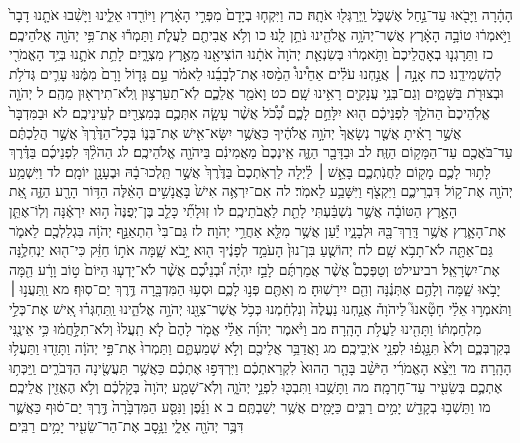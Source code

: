 \documentclass[twoside, openany, parskip=half, 11pt]{book}
\begin{document}
הָהָ֔רָה וַיָּבֹ֖אוּ עַד־נַ֣חַל אֶשְׁכֹּ֑ל וַֽיְרַגְּל֖וּ אֹתָֽהּ׃ כה וַיִּקְח֤וּ בְיָדָם֙ מִפְּרִ֣י הָאָ֔רֶץ וַיּוֹרִ֖דוּ אֵלֵ֑ינוּ וַיָּשִׁ֨בוּ אֹתָ֤נוּ דָבָר֙ וַיֹּ֣אמְר֔וּ טוֹבָ֣ה הָאָ֔רֶץ אֲשֶׁר־יְהֹוָ֥ה אֱלֹהֵ֖ינוּ נֹתֵ֥ן לָֽנוּ׃ כו וְלֹ֥א אֲבִיתֶ֖ם לַעֲלֹ֑ת וַתַּמְר֕וּ אֶת־פִּ֥י יְהֹוָ֖ה אֱלֹהֵיכֶֽם׃ כז וַתֵּרָגְנ֤וּ בְאׇהֳלֵיכֶם֙ וַתֹּ֣אמְר֔וּ בְּשִׂנְאַ֤ת יְהֹוָה֙ אֹתָ֔נוּ הוֹצִיאָ֖נוּ מֵאֶ֣רֶץ מִצְרָ֑יִם לָתֵ֥ת אֹתָ֛נוּ בְּיַ֥ד הָאֱמֹרִ֖י לְהַשְׁמִידֵֽנוּ׃ כח אָנָ֣ה ׀ אֲנַ֣חְנוּ עֹלִ֗ים אַחֵ֩ינוּ֩ הֵמַ֨סּוּ אֶת־לְבָבֵ֜נוּ לֵאמֹ֗ר עַ֣ם גָּד֤וֹל וָרָם֙ מִמֶּ֔נּוּ עָרִ֛ים גְּדֹלֹ֥ת וּבְצוּרֹ֖ת בַּשָּׁמָ֑יִם וְגַם־בְּנֵ֥י עֲנָקִ֖ים רָאִ֥ינוּ שָֽׁם׃ כט וָאֹמַ֖ר אֲלֵכֶ֑ם לֹֽא־תַעַרְצ֥וּן וְֽלֹא־תִירְא֖וּן מֵהֶֽם׃ ל יְהֹוָ֤ה אֱלֹֽהֵיכֶם֙ הַהֹלֵ֣ךְ לִפְנֵיכֶ֔ם ה֖וּא יִלָּחֵ֣ם לָכֶ֑ם כְּ֠כֹ֠ל אֲשֶׁ֨ר עָשָׂ֧ה אִתְּכֶ֛ם בְּמִצְרַ֖יִם לְעֵינֵיכֶֽם׃ לא וּבַמִּדְבָּר֙ אֲשֶׁ֣ר רָאִ֔יתָ אֲשֶׁ֤ר נְשָׂאֲךָ֙ יְהֹוָ֣ה אֱלֹהֶ֔יךָ כַּאֲשֶׁ֥ר יִשָּׂא־אִ֖ישׁ אֶת־בְּנ֑וֹ בְּכׇל־הַדֶּ֙רֶךְ֙ אֲשֶׁ֣ר הֲלַכְתֶּ֔ם עַד־בֹּאֲכֶ֖ם עַד־הַמָּק֥וֹם הַזֶּֽה׃ לב וּבַדָּבָ֖ר הַזֶּ֑ה אֵֽינְכֶם֙ מַאֲמִינִ֔ם בַּיהֹוָ֖ה אֱלֹהֵיכֶֽם׃ לג הַהֹלֵ֨ךְ לִפְנֵיכֶ֜ם בַּדֶּ֗רֶךְ לָת֥וּר לָכֶ֛ם מָק֖וֹם לַחֲנֹֽתְכֶ֑ם בָּאֵ֣שׁ ׀ לַ֗יְלָה לַרְאֹֽתְכֶם֙ בַּדֶּ֙רֶךְ֙ אֲשֶׁ֣ר תֵּֽלְכוּ־בָ֔הּ וּבֶעָנָ֖ן יוֹמָֽם׃ לד וַיִּשְׁמַ֥ע יְהֹוָ֖ה אֶת־ק֣וֹל דִּבְרֵיכֶ֑ם וַיִּקְצֹ֖ף וַיִּשָּׁבַ֥ע לֵאמֹֽר׃ לה אִם־יִרְאֶ֥ה אִישׁ֙ בָּאֲנָשִׁ֣ים הָאֵ֔לֶּה הַדּ֥וֹר הָרָ֖ע הַזֶּ֑ה אֵ֚ת הָאָ֣רֶץ הַטּוֹבָ֔ה אֲשֶׁ֣ר נִשְׁבַּ֔עְתִּי לָתֵ֖ת לַאֲבֹתֵיכֶֽם׃ לו זֽוּלָתִ֞י כָּלֵ֤ב בֶּן־יְפֻנֶּה֙ ה֣וּא יִרְאֶ֔נָּה וְלֽוֹ־אֶתֵּ֧ן אֶת־הָאָ֛רֶץ אֲשֶׁ֥ר דָּֽרַךְ־בָּ֖הּ וּלְבָנָ֑יו יַ֕עַן אֲשֶׁ֥ר מִלֵּ֖א אַחֲרֵ֥י יְהֹוָה׃ לז גַּם־בִּי֙ הִתְאַנַּ֣ף יְהֹוָ֔ה בִּגְלַלְכֶ֖ם לֵאמֹ֑ר גַּם־אַתָּ֖ה לֹא־תָבֹ֥א שָֽׁם׃ לח יְהוֹשֻׁ֤עַ בִּן־נוּן֙ הָעֹמֵ֣ד לְפָנֶ֔יךָ ה֖וּא יָ֣בֹא שָׁ֑מָּה אֹת֣וֹ חַזֵּ֔ק כִּי־ה֖וּא יַנְחִלֶ֥נָּה אֶת־יִשְׂרָאֵֽל׃ רביעילט וְטַפְּכֶם֩ אֲשֶׁ֨ר אֲמַרְתֶּ֜ם לָבַ֣ז יִהְיֶ֗ה וּ֠בְנֵיכֶ֠ם אֲשֶׁ֨ר לֹא־יָדְע֤וּ הַיּוֹם֙ ט֣וֹב וָרָ֔ע הֵ֖מָּה יָבֹ֣אוּ שָׁ֑מָּה וְלָהֶ֣ם אֶתְּנֶ֔נָּה וְהֵ֖ם יִירָשֽׁוּהָ׃ מ וְאַתֶּ֖ם פְּנ֣וּ לָכֶ֑ם וּסְע֥וּ הַמִּדְבָּ֖רָה דֶּ֥רֶךְ יַם־סֽוּף׃ מא וַֽתַּעֲנ֣וּ ׀ וַתֹּאמְר֣וּ אֵלַ֗י חָטָ֘אנוּ֮ לַיהֹוָה֒ אֲנַ֤חְנוּ נַעֲלֶה֙ וְנִלְחַ֔מְנוּ כְּכֹ֥ל אֲשֶׁר־צִוָּ֖נוּ יְהֹוָ֣ה אֱלֹהֵ֑ינוּ וַֽתַּחְגְּר֗וּ אִ֚ישׁ אֶת־כְּלֵ֣י מִלְחַמְתּ֔וֹ וַתָּהִ֖ינוּ לַעֲלֹ֥ת הָהָֽרָה׃ מב וַיֹּ֨אמֶר יְהֹוָ֜ה אֵלַ֗י אֱמֹ֤ר לָהֶם֙ לֹ֤א תַֽעֲלוּ֙ וְלֹא־תִלָּ֣חֲמ֔וּ כִּ֥י אֵינֶ֖נִּי בְּקִרְבְּכֶ֑ם וְלֹא֙ תִּנָּ֣גְפ֔וּ לִפְנֵ֖י אֹיְבֵיכֶֽם׃ מג וָאֲדַבֵּ֥ר אֲלֵיכֶ֖ם וְלֹ֣א שְׁמַעְתֶּ֑ם וַתַּמְרוּ֙ אֶת־פִּ֣י יְהֹוָ֔ה וַתָּזִ֖דוּ וַתַּעֲל֥וּ הָהָֽרָה׃ מד וַיֵּצֵ֨א הָאֱמֹרִ֜י הַיֹּשֵׁ֨ב בָּהָ֤ר הַהוּא֙ לִקְרַאתְכֶ֔ם וַיִּרְדְּפ֣וּ אֶתְכֶ֔ם כַּאֲשֶׁ֥ר תַּעֲשֶׂ֖ינָה הַדְּבֹרִ֑ים וַֽיַּכְּת֥וּ אֶתְכֶ֛ם בְּשֵׂעִ֖יר עַד־חׇרְמָֽה׃ מה וַתָּשֻׁ֥בוּ וַתִּבְכּ֖וּ לִפְנֵ֣י יְהֹוָ֑ה וְלֹֽא־שָׁמַ֤ע יְהֹוָה֙ בְּקֹ֣לְכֶ֔ם וְלֹ֥א הֶאֱזִ֖ין אֲלֵיכֶֽם׃ מו וַתֵּשְׁב֥וּ בְקָדֵ֖שׁ יָמִ֣ים רַבִּ֑ים כַּיָּמִ֖ים אֲשֶׁ֥ר יְשַׁבְתֶּֽם׃ ב א וַנֵּ֜פֶן וַנִּסַּ֤ע הַמִּדְבָּ֙רָה֙ דֶּ֣רֶךְ יַם־ס֔וּף כַּאֲשֶׁ֛ר דִּבֶּ֥ר יְהֹוָ֖ה אֵלָ֑י וַנָּ֥סׇב אֶת־הַר־שֵׂעִ֖יר יָמִ֥ים רַבִּֽים׃
\end{document}
